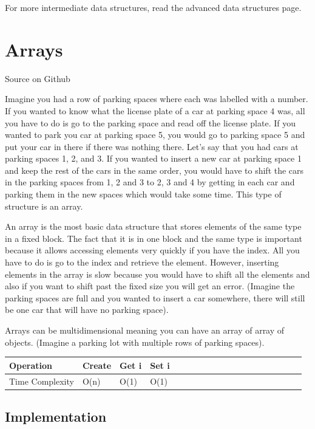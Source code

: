 \documentclass[11pt,oneside]{book}
\begin{document}
For more intermediate data structures, read the advanced data structures page.

\section{Arrays}

Source on Github

Imagine you had a row of parking spaces where each was labelled with a number. If you wanted to know what the license plate of a car at parking space 4 was, all you have to do is go to the parking space and read off the license plate. If you wanted to park you car at parking space 5, you would go to parking space 5 and put your car in there if there was nothing there. Let's say that you had cars at parking spaces 1, 2, and 3. If you wanted to insert a new car at parking space 1 and keep the rest of the cars in the same order, you would have to shift the cars in the parking spaces from 1, 2 and 3 to 2, 3 and 4 by getting in each car and parking them in the new spaces which would take some time. This type of structure is an array.

An array is the most basic data structure that stores elements of the same type in a fixed block. The fact that it is in one block and the same type is important because it allows accessing elements very quickly if you have the index. All you have to do is go to the index and retrieve the element. However, inserting elements in the array is slow because you would have to shift all the elements and also if you want to shift past the fixed size you will get an error. (Imagine the parking spaces are full and you wanted to insert a car somewhere, there will still be one car that will have no parking space).

Arrays can be multidimensional meaning you can have an array of array of objects. (Imagine a parking lot with multiple rows of parking spaces).

\vspace{10pt} \begin{tabular}{|l|l|l|l|l|l|l|l|l|l|l|l|l|l|l|l|l|l|l}\hline


  Operation &
  Create &
  Get i &
  Set i\\
\hline


  Time Complexity &
  O(n) &
  O(1) &
  O(1)\\

\hline\end{tabular}

\subsection{Implementation}
\end{document}
